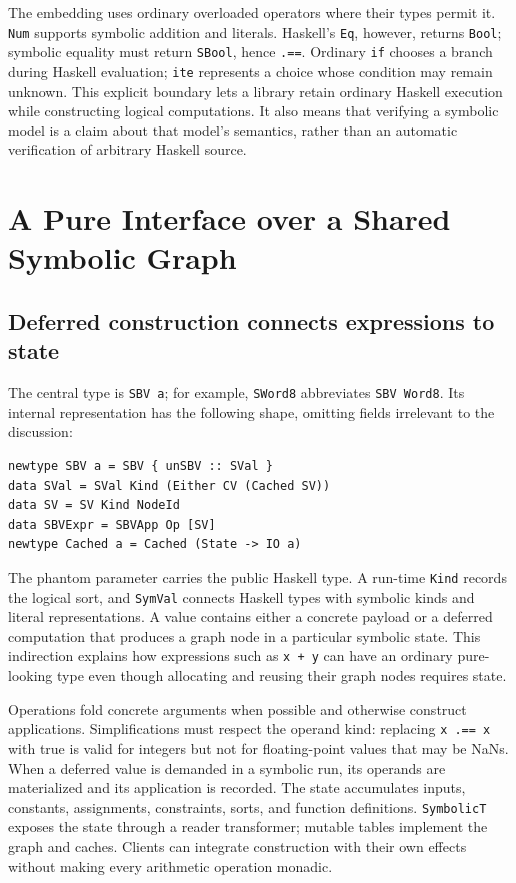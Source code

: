 \documentclass[acmsmall,screen,nonacm]{acmart}
\newcommand{\code}[1]{\texttt{#1}}
\begin{document}
The embedding uses ordinary overloaded operators where their types permit it.
\code{Num} supports symbolic addition and literals. Haskell's \code{Eq},
however, returns \code{Bool}; symbolic equality must return \code{SBool}, hence
\code{.==}. Ordinary \code{if} chooses a branch during Haskell evaluation;
\code{ite} represents a choice whose condition may remain unknown. This
explicit boundary lets a library retain ordinary Haskell execution while
constructing logical computations. It also means that verifying a symbolic
model is a claim about that model's semantics, rather than an automatic
verification of arbitrary Haskell source.

\section{A Pure Interface over a Shared Symbolic Graph}
\label{sec:architecture}

\subsection{Deferred construction connects expressions to state}

The central type is \code{SBV a}; for example, \code{SWord8} abbreviates
\code{SBV Word8}. Its internal representation has the following shape, omitting
fields irrelevant to the discussion:
\begin{lstlisting}
newtype SBV a = SBV { unSBV :: SVal }
data SVal = SVal Kind (Either CV (Cached SV))
data SV = SV Kind NodeId
data SBVExpr = SBVApp Op [SV]
newtype Cached a = Cached (State -> IO a)
\end{lstlisting}
The phantom parameter carries the public Haskell type. A run-time \code{Kind}
records the logical sort, and \code{SymVal} connects Haskell types with symbolic
kinds and literal representations. A value contains either a concrete payload
or a deferred computation that produces a graph node in a particular symbolic
state. This indirection explains how expressions such as \code{x + y} can have
an ordinary pure-looking type even though allocating and reusing their graph
nodes requires state.

Operations fold concrete arguments when possible and otherwise construct
applications. Simplifications must respect the operand kind: replacing
\code{x .== x} with true is valid for integers but not for floating-point
values that may be NaNs. When a deferred value is demanded in a symbolic run, its operands
are materialized and its application is recorded. The state accumulates inputs,
constants, assignments, constraints, sorts, and function definitions.
\code{SymbolicT} exposes the state through a reader transformer; mutable tables
implement the graph and caches. Clients can integrate construction with their
own effects without making every arithmetic operation monadic.
\end{document}
